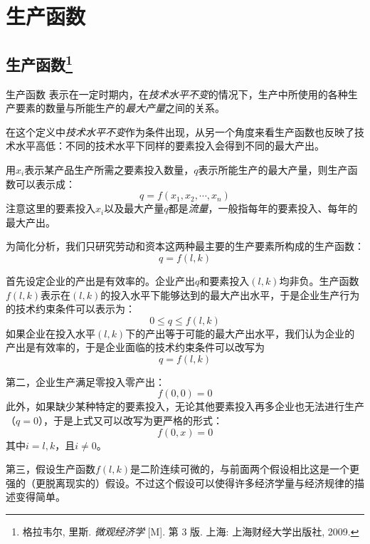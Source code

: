 \chapter{生产函数}
\label{sec:production-functions}

\section{生产函数\footnote{%
格拉韦尔, 里斯. \emph{微观经济学} [M]. 第 3 版. 上海: 上海财经大学出版社, 2009.}}

生产函数
表示在一定时期内，在\emph{技术水平不变}的情况下，生产中所使用的各种生产要素的数量与所能生产的\emph{最大产量}之间的关系。

在这个定义中\emph{技术水平不变}作为条件出现，从另一个角度来看生产函数也反映了技术水平高低：不同的技术水平下同样的要素投入会得到不同的最大产出。

用$x_i$表示某产品生产所需之要素投入数量，$q$表示所能生产的最大产量，则生产函数可以表示成：
\[
q=f(x_1, x_2, \cdots , x_n)
\]
注意这里的要素投入$x_i$以及最大产量$q$都是\emph{流量}，一般指每年的要素投入、每年的最大产出。

为简化分析，我们只研究劳动和资本这两种最主要的生产要素所构成的生产函数：
\begin{equation}
q=f(l, k)
\end{equation}

首先设定企业的产出是有效率的。企业产出$q$和要素投入$(l,k)$均非负。生产函数$f(l,k)$表示在$(l,k)$的投入水平下能够达到的最大产出水平，于是企业生产行为的技术约束条件可以表示为：
\begin{equation}
0 \le q \le f(l,k)
\end{equation}
如果企业在投入水平$(l,k)$下的产出等于可能的最大产出水平，我们认为企业的产出是有效率的，于是企业面临的技术约束条件可以改写为
\begin{equation}
q = f(l,k)
\end{equation}

第二，企业生产满足零投入零产出：
\begin{equation}
f(0,0)=0
\end{equation}
此外，如果缺少某种特定的要素投入，无论其他要素投入再多企业也无法进行生产（$q=0$），于是上式又可以改写为更严格的形式：
\begin{equation}
f(0,x) = 0
\end{equation}
其中$i=l,k$，且$i \ne 0$。

第三，假设生产函数$f(l,k)$是二阶连续可微的，与前面两个假设相比这是一个更强的（更脱离现实的）假设。不过这个假设可以使得许多经济学量与经济规律的描述变得简单。

